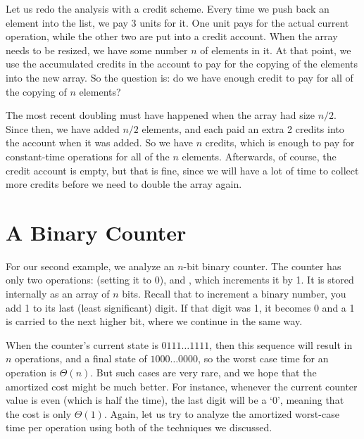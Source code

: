 \smallskip

Let us redo the analysis with a credit scheme.
Every time we push back an element into the list, we pay 3 units for it.
One unit pays for the actual current operation,
while the other two are put into a credit account.
When the array needs to be resized,
we have some number $n$ of elements in it.
At that point, we use the accumulated credits in the account to pay
for the copying of the elements into the new array. 
So the question is: do we have enough credit to pay for all of the
copying of $n$ elements? 

The most recent doubling must have happened when the array had size
$n/2$. Since then, we have added $n/2$ elements, and each paid an
extra 2 credits into the account when it was added. So we have $n$
credits, which is enough to pay for constant-time operations for all
of the $n$ elements. Afterwards, of course, the credit account is
empty, but that is fine, since we will have a lot of time to collect
more credits before we need to double the array again.

\section{A Binary Counter}
\label{sec:amortized:binary-counter}

For our second example, we analyze an $n$-bit binary counter. 
The counter has only two operations:
 (setting it to 0), and ,
which increments it by 1.
It is stored internally as an array of $n$ bits.
Recall that to increment a binary number,
you add 1 to its last (least significant) digit.
If that digit was 1, it becomes 0 and a 1 is carried to the next
higher bit, where we continue in the same way.

When the counter's current state is $0111\ldots 1111$, then this
sequence will result in $n$ operations, and a final state of
$1000\ldots0000$, so the worst case time for an 
operation is $\Theta(n)$. But such cases are very rare, and we hope
that the amortized cost might be much better. For instance, whenever
the current counter value is even (which is half the time), the last
digit will be a `0', meaning that the cost is only $\Theta(1)$.
Again, let us try to analyze the amortized worst-case time per
operation using both of the techniques we discussed.

